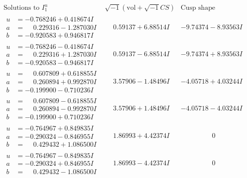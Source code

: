 \documentclass[1p]{elsarticle_modified}
\theoremstyle{definition}
\newcommand{\I}{\sqrt{-1}}
\begin{document}
$$\begin{array}{c|c|c}  
\text{Solutions to }I^u_{1}& \I (\text{vol} + \sqrt{-1}CS) & \text{Cusp shape}\\
 \hline 
\begin{aligned}
u &= -0.768246 + 0.418674 I \\
a &= \phantom{-}0.229316 - 1.287030 I \\
b &= -0.920583 + 0.946817 I\end{aligned}
 & \phantom{-}0.59137 + 6.88514 I & -9.74374 - 8.93563 I \\ \hline\begin{aligned}
u &= -0.768246 - 0.418674 I \\
a &= \phantom{-}0.229316 + 1.287030 I \\
b &= -0.920583 - 0.946817 I\end{aligned}
 & \phantom{-}0.59137 - 6.88514 I & -9.74374 + 8.93563 I \\ \hline\begin{aligned}
u &= \phantom{-}0.607809 + 0.618855 I \\
a &= \phantom{-}0.260894 + 0.992870 I \\
b &= -0.199900 - 0.710236 I\end{aligned}
 & \phantom{-}3.57906 - 1.48496 I & -4.05718 + 4.03244 I \\ \hline\begin{aligned}
u &= \phantom{-}0.607809 - 0.618855 I \\
a &= \phantom{-}0.260894 - 0.992870 I \\
b &= -0.199900 + 0.710236 I\end{aligned}
 & \phantom{-}3.57906 + 1.48496 I & -4.05718 - 4.03244 I \\ \hline\begin{aligned}
u &= -0.764967 + 0.849835 I \\
a &= -0.290324 - 0.846955 I \\
b &= \phantom{-}0.429432 + 1.086500 I\end{aligned}
 & \phantom{-}1.86993 + 4.42374 I & \phantom{-0.000000 } 0 \\ \hline\begin{aligned}
u &= -0.764967 - 0.849835 I \\
a &= -0.290324 + 0.846955 I \\
b &= \phantom{-}0.429432 - 1.086500 I\end{aligned}
 & \phantom{-}1.86993 - 4.42374 I & \phantom{-0.000000 } 0 \\ \hline\begin{aligned}

\end{aligned}
\end{array}$$
\end{document}
